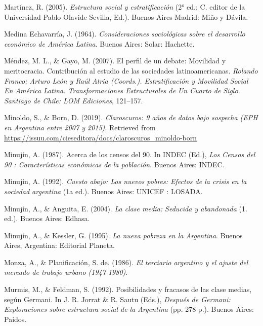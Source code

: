 \documentclass[
]{article}
\newlength{\cslhangindent}
\newlength{\cslentryspacingunit} %
\newenvironment{CSLReferences}[2] %
 {%
  \setlength{\parindent}{0pt}
  \ifodd #1
  \let\oldpar\par
  \def\par{\hangindent=\cslhangindent\oldpar}
  \fi
  \setlength{\parskip}{#2\cslentryspacingunit}
 }%
 {}
\begin{document}
\begin{CSLReferences}{1}{0}
\leavevmode{}%
Martínez, R. (2005). \emph{Estructura social y estratificación} (2° ed.; C. editor de la Universidad Pablo Olavide Sevilla, Ed.). Buenos Aires-Madrid: Miño y Dávila.

\leavevmode{}%
Medina Echavarría, J. (1964). \emph{Consideraciones sociológicas sobre el desarrollo económico de {América} {Latina}}. Buenos Aires: Solar: Hachette.

\leavevmode{}%
Méndez, M. L., \& Gayo, M. (2007). El perfil de un debate: Movilidad y meritocracia. {Contribución} al estudio de las sociedades latinoamericanas. \emph{Rolando Franco; Arturo León y Raúl Atria (Coords.). Estratificación y Movilidad Social En América Latina. Transformaciones Estructurales de Un Cuarto de Siglo. Santiago de Chile: LOM Ediciones}, 121--157.

\leavevmode{}%
Minoldo, S., \& Born, D. (2019). \emph{Claroscuros: 9 años de datos bajo sospecha ({EPH} en {Argentina} entre 2007 y 2015)}. Retrieved from \url{https://issuu.com/cieseditora/docs/claroscuros_minoldo-born}

\leavevmode{}%
Minujín, A. (1987). Acerca de los censos del 90. In INDEC (Ed.), \emph{Los {Censos} del 90 : Características económicas de la población}. Buenos Aires: INDEC.

\leavevmode{}%
Minujín, A. (1992). \emph{Cuesto abajo: Los nuevos pobres: Efectos de la crisis en la sociedad argentina} (1a ed.). Buenos Aires: UNICEF : LOSADA.

\leavevmode{}%
Minujín, A., \& Anguita, E. (2004). \emph{La clase media: Seducida y abandonada} (1. ed.). Buenos Aires: Edhasa.

\leavevmode{}%
Minujín, A., \& Kessler, G. (1995). \emph{La nueva pobreza en la {Argentina}}. Buenos Aires, Argentina: Editorial Planeta.

\leavevmode{}%
Monza, A., \& Planificación, S. de. (1986). \emph{El terciario argentino y el ajuste del mercado de trabajo urbano (1947-1980)}.

\leavevmode{}%
Murmis, M., \& Feldman, S. (1992). Posibilidades y fracasos de las clase medias, según {Germani}. In J. R. Jorrat \& R. Sautu (Eds.), \emph{Después de {Germani}: {Exploraciones} sobre estructura social de la {Argentina}} (pp. 278 p.). Buenos Aires: Paidos.


\end{CSLReferences}
\end{document}
